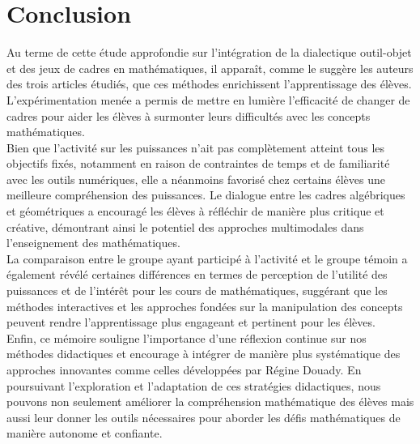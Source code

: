 \section*{Conclusion}

Au terme de cette étude approfondie sur l'intégration de la dialectique outil-objet et des jeux de cadres en mathématiques,
il apparaît,
comme le suggère les auteurs des trois articles étudiés,
que ces méthodes enrichissent l'apprentissage des élèves.
L'expérimentation menée a permis de mettre en lumière l'efficacité de changer de cadres pour aider les élèves à surmonter leurs difficultés avec les concepts mathématiques.\\

Bien que l'activité sur les puissances n'ait pas complètement atteint tous les objectifs fixés,
notamment en raison de contraintes de temps et de familiarité avec les outils numériques,
elle a néanmoins favorisé chez certains élèves une meilleure compréhension des puissances.
Le dialogue entre les cadres algébriques et géométriques a encouragé les élèves à réfléchir de manière plus critique et créative,
démontrant ainsi le potentiel des approches multimodales dans l'enseignement des mathématiques.\\

La comparaison entre le groupe ayant participé à l'activité et le groupe témoin a également révélé certaines différences en termes de perception de l'utilité des puissances et de l'intérêt pour les cours de mathématiques,
suggérant que les méthodes interactives et les approches fondées sur la manipulation des concepts peuvent rendre l'apprentissage plus engageant et pertinent pour les élèves.\\

Enfin,
ce mémoire souligne l'importance d'une réflexion continue sur nos méthodes didactiques et encourage à intégrer de manière plus systématique des approches innovantes comme celles développées par Régine Douady.
En poursuivant l'exploration et l'adaptation de ces stratégies didactiques,
nous pouvons non seulement améliorer la compréhension mathématique des élèves mais aussi leur donner les outils nécessaires pour aborder les défis mathématiques de manière autonome et confiante.